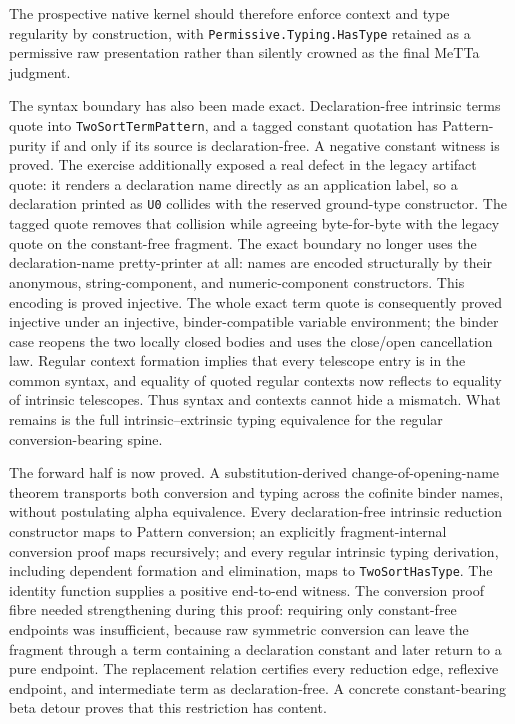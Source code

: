 \documentclass[11pt]{article}
\newcommand{\code}[1]{\texttt{#1}}
\begin{document}
The prospective native kernel should therefore enforce context and type regularity
by construction, with
\code{Permissive.Typing.HasType} retained as a permissive raw presentation rather than
silently crowned as the final MeTTa judgment.

The syntax boundary has also been made exact.  Declaration-free intrinsic terms
quote into \code{TwoSortTermPattern}, and a tagged constant quotation has Pattern-purity
if and only if its source is declaration-free.  A negative constant witness is
proved.  The exercise additionally exposed a real defect in the legacy artifact
quote: it renders a declaration name directly as an application label, so a
declaration printed as \code{U0} collides with the reserved ground-type constructor.
The tagged quote removes that collision while agreeing byte-for-byte with the
legacy quote on the constant-free fragment.  The exact boundary no longer uses
the declaration-name pretty-printer at all: names are encoded structurally by
their anonymous, string-component, and numeric-component constructors.  This
encoding is proved injective.  The whole exact term quote is consequently proved
injective under an injective, binder-compatible variable environment; the binder
case reopens the two locally closed bodies and uses the close/open cancellation
law.  Regular context formation implies that every telescope entry is in the
common syntax, and equality of quoted regular contexts now reflects to equality
of intrinsic telescopes.  Thus syntax and contexts cannot hide a mismatch.  What
remains is the full intrinsic--extrinsic typing equivalence for the regular
conversion-bearing spine.

The forward half is now proved.  A substitution-derived change-of-opening-name
theorem transports both conversion and typing across the cofinite binder names,
without postulating alpha equivalence.  Every declaration-free intrinsic
reduction constructor maps to Pattern conversion; an explicitly
fragment-internal conversion proof maps recursively; and every regular intrinsic
typing derivation, including dependent formation and elimination, maps to
\code{TwoSortHasType}.  The identity function supplies a positive end-to-end witness.
The conversion proof fibre needed strengthening during this proof: requiring only
constant-free endpoints was insufficient, because raw symmetric conversion can
leave the fragment through a term containing a declaration constant and later
return to a pure endpoint.  The replacement relation certifies every reduction
edge, reflexive endpoint, and intermediate term as declaration-free.  A concrete
constant-bearing beta detour proves that this restriction has content.
\end{document}
